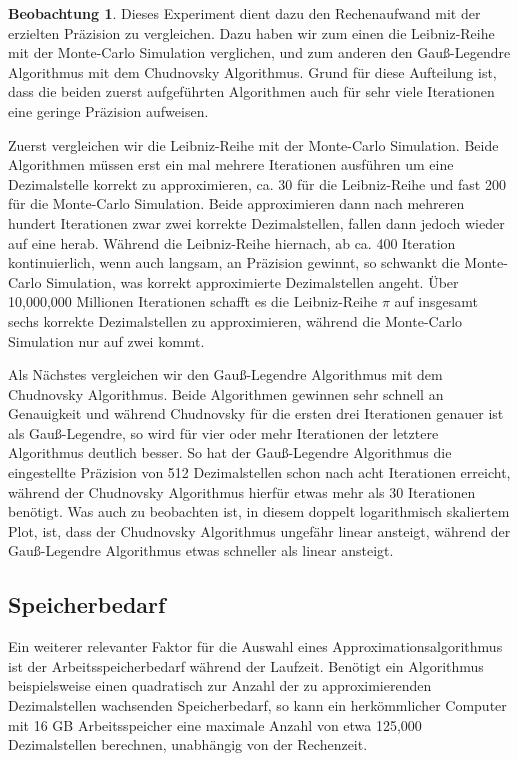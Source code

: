 \documentclass{scrartcl}
\theoremstyle{definition}
\newtheorem{approximation sequence}{Annäherungsfolge}
\newtheorem{observation}{Beobachtung}
\begin{document}
\begin{observation}
    Dieses Experiment dient dazu den Rechenaufwand mit der erzielten Präzision
    zu vergleichen. Dazu haben wir zum einen die Leibniz-Reihe mit der
    Monte-Carlo Simulation verglichen, und zum anderen den Gauß-Legendre
    Algorithmus mit dem Chudnovsky Algorithmus. Grund für diese Aufteilung ist,
    dass die beiden zuerst aufgeführten Algorithmen auch für sehr viele
    Iterationen eine geringe Präzision aufweisen.

    Zuerst vergleichen wir die Leibniz-Reihe mit der Monte-Carlo Simulation.
    Beide Algorithmen müssen erst ein mal mehrere Iterationen ausführen um eine
    Dezimalstelle korrekt zu approximieren, ca. 30 für die Leibniz-Reihe und
    fast 200 für die Monte-Carlo Simulation. Beide approximieren dann nach
    mehreren hundert Iterationen zwar zwei korrekte Dezimalstellen, fallen dann
    jedoch wieder auf eine herab. Während die Leibniz-Reihe hiernach, ab ca.
    400 Iteration kontinuierlich, wenn auch langsam, an Präzision gewinnt, so
    schwankt die Monte-Carlo Simulation, was korrekt approximierte
    Dezimalstellen angeht. Über 10,000,000 Millionen Iterationen schafft es die
    Leibniz-Reihe \(\pi\) auf insgesamt sechs korrekte Dezimalstellen zu
    approximieren, während die Monte-Carlo Simulation nur auf zwei kommt.

    Als Nächstes vergleichen wir den Gauß-Legendre Algorithmus mit dem
    Chudnovsky Algorithmus. Beide Algorithmen gewinnen sehr schnell an
    Genauigkeit und während Chudnovsky für die ersten drei Iterationen genauer
    ist als Gauß-Legendre, so wird für vier oder mehr Iterationen der letztere
    Algorithmus deutlich besser. So hat der Gauß-Legendre Algorithmus die
    eingestellte Präzision von 512 Dezimalstellen schon nach acht Iterationen
    erreicht, während der Chudnovsky Algorithmus hierfür etwas mehr als 30
    Iterationen benötigt. Was auch zu beobachten ist, in diesem doppelt
    logarithmisch skaliertem Plot, ist, dass der Chudnovsky Algorithmus
    ungefähr linear ansteigt, während der Gauß-Legendre Algorithmus etwas
    schneller als linear ansteigt.
\end{observation}

\pagebreak

\subsection{Speicherbedarf}

Ein weiterer relevanter Faktor für die Auswahl eines Approximationsalgorithmus
ist der Arbeitsspeicherbedarf während der Laufzeit. Benötigt ein Algorithmus
beispielsweise einen quadratisch zur Anzahl der zu approximierenden
Dezimalstellen wachsenden Speicherbedarf, so kann ein herkömmlicher Computer
mit 16 GB Arbeitsspeicher eine maximale Anzahl von etwa 125,000 Dezimalstellen
berechnen, unabhängig von der Rechenzeit.
\end{document}
